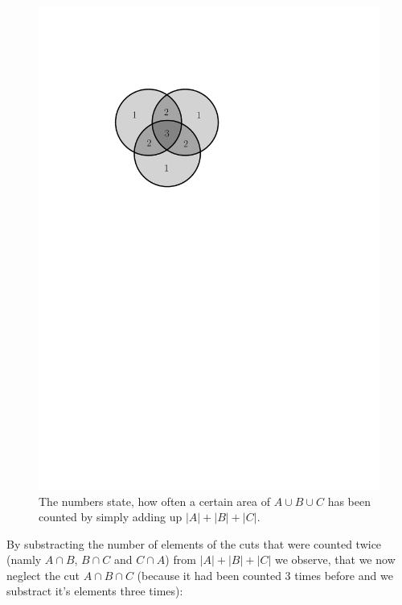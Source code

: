 \begin{figure}[htb]
  \centering
  \includegraphics[scale=.5]{02_higher_combinatorics/pics/a_cut_b_cut_c.pdf}
  \caption{The numbers state, how often a certain area of $A \cup B \cup C$ has been counted by simply adding up $|A| + |B| + |C|$.}
\end{figure}

By substracting the number of elements of the cuts that were counted twice (namly $A \cap B$, $B \cap C$ and $C \cap A$) from $|A| + |B| + |C|$
we observe, that we now neglect the cut $A \cap B \cap C$ (because it had been counted 3 times before and we substract it's elements three times):

